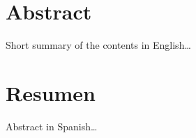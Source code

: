 \begingroup
\let\clearpage\relax
\let\cleardoublepage\relax
\let\cleardoublepage\relax

\chapter*{Abstract}
Short summary of the contents in English\dots


\vfill

\chapter*{Resumen}
Abstract in Spanish\dots


\endgroup			

\vfill
